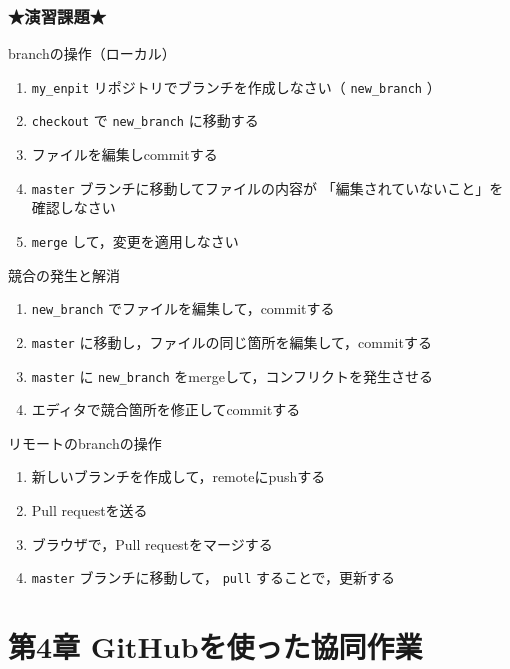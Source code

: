 \documentclass[t, aspectratio=169]{beamer}
\begin{document}
\section{★演習課題★}
\label{sec-3-4}
\begin{frame}[fragile,label=sec-3-4-1]{branchの操作（ローカル）}
 \begin{enumerate}
\item \texttt{my\_enpit} リポジトリでブランチを作成しなさい（ \texttt{new\_branch} ）
\item \texttt{checkout} で \texttt{new\_branch} に移動する
\item ファイルを編集しcommitする
\item \texttt{master} ブランチに移動してファイルの内容が
「編集されていないこと」を確認しなさい
\item \texttt{merge} して，変更を適用しなさい
\end{enumerate}
\end{frame}
\begin{frame}[fragile,label=sec-3-4-2]{競合の発生と解消}
 \begin{enumerate}
\item \texttt{new\_branch} でファイルを編集して，commitする
\item \texttt{master} に移動し，ファイルの同じ箇所を編集して，commitする
\item \texttt{master} に \texttt{new\_branch} をmergeして，コンフリクトを発生させる
\item エディタで競合箇所を修正してcommitする
\end{enumerate}
\end{frame}
\begin{frame}[fragile,label=sec-3-4-3]{リモートのbranchの操作}
 \begin{enumerate}
\item 新しいブランチを作成して，remoteにpushする
\item Pull requestを送る
\item ブラウザで，Pull requestをマージする
\item \texttt{master} ブランチに移動して， \texttt{pull} することで，更新する
\end{enumerate}
\end{frame}
\part{第4章 GitHubを使った協同作業}
\label{sec-4}
\end{document}
